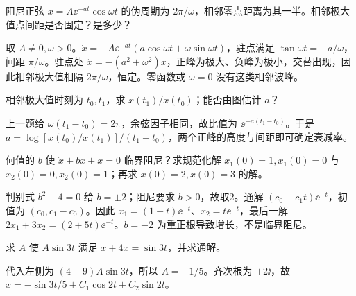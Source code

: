 \begin{exercise}\label{cw:rec08-3}
阻尼正弦 $x=A\ee^{-at}\cos\omega t$ 的伪周期为 $2\pi/\omega$，相邻零点距离为其一半。相邻极大值点间距是否固定？是多少？
\end{exercise}
\begin{solution}
取 $A\ne0,\omega>0$。$\dot x=-A\ee^{-at}(a\cos\omega t+\omega\sin\omega t)$，驻点满足 $\tan\omega t=-a/\omega$，间距 $\pi/\omega$。驻点处 $\ddot x=-(a^2+\omega^2)x$，正峰为极大、负峰为极小，交替出现，因此相邻极大值相隔 $2\pi/\omega$，恒定。零函数或 $\omega=0$ 没有这类相邻波峰。
\par{}
\end{solution}

\begin{exercise}\label{cw:rec08-4}
相邻极大值时刻为 $t_0,t_1$，求 $x(t_1)/x(t_0)$；能否由图估计 $a$？
\end{exercise}
\begin{solution}
上一题给 $\omega(t_1-t_0)=2\pi$，余弦因子相同，故比值为 $\ee^{-a(t_1-t_0)}$。于是 $a=\log[x(t_0)/x(t_1)]/(t_1-t_0)$，两个正峰的高度与间距即可确定衰减率。
\par{}
\end{solution}

\begin{exercise}\label{cw:rec08-5}
何值的 $b$ 使 $\ddot x+b\dot x+x=0$ 临界阻尼？求规范化解 $x_1(0)=1,\dot x_1(0)=0$ 与 $x_2(0)=0,\dot x_2(0)=1$；再求 $x(0)=2,\dot x(0)=3$ 的解。
\end{exercise}
\begin{solution}
判别式 $b^2-4=0$ 给 $b=\pm2$；阻尼要求 $b>0$，故取2。通解 $(c_0+c_1t)\ee^{-t}$，初值为 $(c_0,c_1-c_0)$。因此 $x_1=(1+t)\ee^{-t}$、$x_2=t\ee^{-t}$，最后一解 $2x_1+3x_2=(2+5t)\ee^{-t}$。$b=-2$ 为重正根导致增长，不是临界阻尼。
\par{}
\end{solution}

\begin{exercise}\label{cw:rec09-1}
求 $A$ 使 $A\sin3t$ 满足 $\ddot x+4x=\sin3t$，并求通解。
\end{exercise}
\begin{solution}
代入左侧为 $(4-9)A\sin3t$，所以 $A=-1/5$。齐次根为 $\pm2\ii$，故 $x=-\sin3t/5+C_1\cos2t+C_2\sin2t$。
\par{}
\end{solution}

